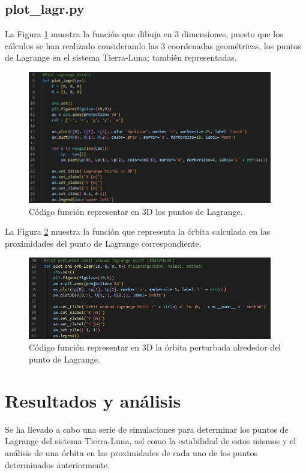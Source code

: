 \documentclass[12pt,a4paper]{article}
\begin{document}
\subsection{plot\_lagr.py}
La Figura \ref{plot_lagr1} muestra la función que dibuja en 3 dimensiones, puesto que los cálculos se han realizado considerando las 3 coordenadas geométricas, los puntos de Lagrange en el sistema Tierra-Luna; también representadas.
\begin{figure}[H]
	\centering
	\includegraphics[width=0.95\textwidth]{FIGURES/mil6/codigo/plot_lagr1.JPG}
	\caption{Código función representar en 3D los puntos de Lagrange.}
	\label{plot_lagr1}
\end{figure}

La Figura \ref{plot_lagr2} muestra la función que representa la órbita calculada en las proximidades del punto de Lagrange correspondiente.
\begin{figure}[H]
	\centering
	\includegraphics[width=0.95\textwidth]{FIGURES/mil6/codigo/plot_lagr2.JPG}
	\caption{Código función representar en 3D la órbita perturbada alrededor del punto de Lagrange.}
	\label{plot_lagr2}
\end{figure}



\section{Resultados y análisis}
Se ha llevado a cabo una serie de simulaciones para determinar los puntos de Lagrange del sistema Tierra-Luna, así como la estabilidad de estos mismos y el análisis de una órbita en las proximidades de cada uno de los puntos determinados anteriormente.
\end{document}
